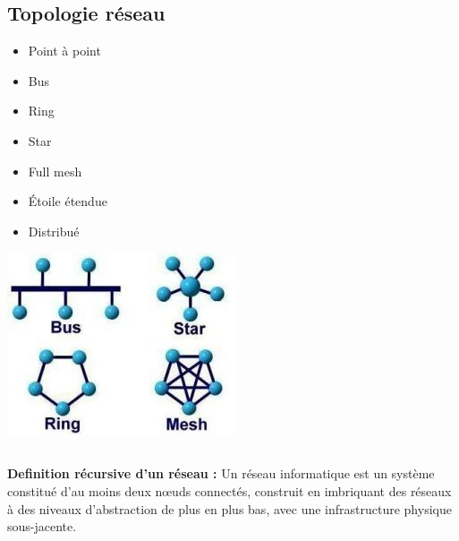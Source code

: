 \documentclass[a4paper, 12pt]{article}
\begin{document}
\subsection*{Topologie réseau}
\begin{minipage}{0.3\textwidth}
    \begin{itemize}
        \item Point à point
        \item Bus
        \item Ring
        \item Star
        \item Full mesh
        \item Étoile étendue
        \item Distribué
    \end{itemize}
\end{minipage}
\begin{minipage}{0.6\textwidth}
    \includegraphics{topologie.jpeg}
\end{minipage}

\subsection*{}
\textbf{Definition récursive d'un réseau :} 
Un réseau informatique est un système constitué d'au moins deux nœuds connectés, construit en imbriquant des réseaux à des niveaux d'abstraction de plus en plus bas, avec une infrastructure physique sous-jacente.
\end{document}
